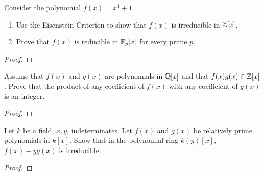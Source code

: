 \begin{problem}
Consider the polynomial $f(x)=x^4+1$.
\begin{enumerate}[label=(\alph*)]
\item Use the Eisenstein Criterion to show that $f(x)$ is irreducible in
  $\mathbb{Z}[x]$.
\item Prove that $f(x)$ is reducible in $\mathbb{F}_p[x]$ for every prime
  $p$.
\end{enumerate}
\end{problem}
\begin{proof}
\end{proof}

\begin{problem}
Assume that $f(x)$ and $g(x)$ are polynomials in $\mathbb{Q}[x]$ and that
$f(x)g(x)\in\mathbb{Z}[x]$. Prove that the product of any coefficient of $f(x)$
with any coefficient of $g(x)$ is an integer.
\end{problem}
\begin{proof}
\end{proof}

\begin{problem}
Let $k$ be a field, $x,y$, indeterminates. Let $f(x)$ and $g(x)$ be
relatively prime polynomials in $k[x]$. Show that in the polynomial ring
$k(y)[x]$, $f(x)-yg(x)$ is irreducible.
\end{problem}
\begin{proof}
\end{proof}

